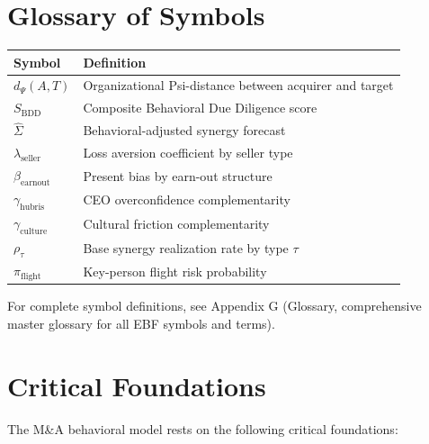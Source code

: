 \section{Glossary of Symbols}
\label{sec:ma-glossary}

\begin{tabular}{lp{10cm}}
\toprule
\textbf{Symbol} & \textbf{Definition} \\
\midrule
$d_\Psi(A,T)$       & Organizational Psi-distance between acquirer and target \\
$S_{\text{BDD}}$     & Composite Behavioral Due Diligence score \\
$\hat{\Sigma}$       & Behavioral-adjusted synergy forecast \\
$\lambda_{\text{seller}}$ & Loss aversion coefficient by seller type \\
$\beta_{\text{earnout}}$  & Present bias by earn-out structure \\
$\gamma_{\text{hubris}}$  & CEO overconfidence complementarity \\
$\gamma_{\text{culture}}$ & Cultural friction complementarity \\
$\rho_\tau$          & Base synergy realization rate by type $\tau$ \\
$\pi_{\text{flight}}$& Key-person flight risk probability \\
\bottomrule
\end{tabular}

\vspace{0.5em}
For complete symbol definitions, see Appendix G (Glossary, comprehensive master
glossary for all EBF symbols and terms).


\section{Critical Foundations}
\label{sec:ma-foundations}

The M\&A behavioral model rests on the following critical foundations:

